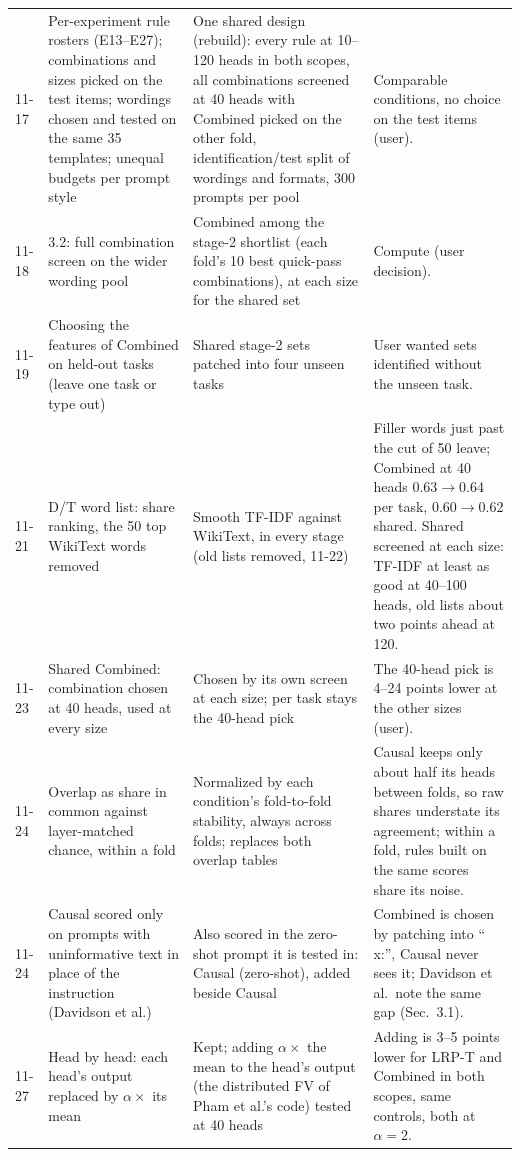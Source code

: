 \documentclass[10pt,a4paper]{article}
\begin{document}
\begin{tabularx}{\textwidth}{@{}p{1.5cm}LLL@{}}
11-17 & Per-experiment rule rosters (E13--E27); combinations and sizes picked on the test items; wordings chosen and tested on the same 35 templates; unequal budgets per prompt style & One shared design (rebuild): every rule at 10--120 heads in both scopes, all combinations screened at 40 heads with Combined picked on the other fold, identification/test split of wordings and formats, 300 prompts per pool & Comparable conditions, no choice on the test items (user). \\
11-18 & 3.2: full combination screen on the wider wording pool & Combined among the stage-2 shortlist (each fold's 10 best quick-pass combinations), at each size for the shared set & Compute (user decision). \\
11-19 & Choosing the features of Combined on held-out tasks (leave one task or type out) & Shared stage-2 sets patched into four unseen tasks & User wanted sets identified without the unseen task. \\
11-21 & D/T word list: share ranking, the 50 top WikiText words removed & Smooth TF-IDF against WikiText, in every stage (old lists removed, 11-22) & Filler words just past the cut of 50 leave; Combined at 40 heads 0.63$\to$0.64 per task, 0.60$\to$0.62 shared. Shared screened at each size: TF-IDF at least as good at 40--100 heads, old lists about two points ahead at 120. \\
11-23 & Shared Combined: combination chosen at 40 heads, used at every size & Chosen by its own screen at each size; per task stays the 40-head pick & The 40-head pick is 4--24 points lower at the other sizes (user). \\
11-24 & Overlap as share in common against layer-matched chance, within a fold & Normalized by each condition's fold-to-fold stability, always across folds; replaces both overlap tables & Causal keeps only about half its heads between folds, so raw shares understate its agreement; within a fold, rules built on the same scores share its noise. \\
11-24 & Causal scored only on prompts with uninformative text in place of the instruction (Davidson et al.) & Also scored in the zero-shot prompt it is tested in: Causal (zero-shot), added beside Causal & Combined is chosen by patching into `` x:'', Causal never sees it; Davidson et al.\ note the same gap (Sec.~3.1). \\
11-27 & Head by head: each head's output replaced by $\alpha\times$ its mean & Kept; adding $\alpha\times$ the mean to the head's output (the distributed FV of Pham et al.'s code) tested at 40 heads & Adding is 3--5 points lower for LRP-T and Combined in both scopes, same controls, both at $\alpha=2$. \\
\bottomrule
\end{tabularx}
\normalsize
\end{document}
